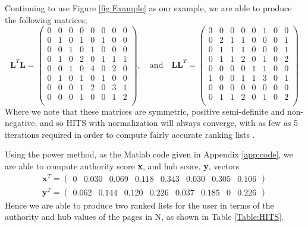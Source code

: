\documentclass[11pt]{report}
\begin{document}
Continuing to use Figure \ref{fig:Example} as our example, we are able to produce the following matrices;
\begin{equation*}
\textbf{L}^T\textbf{L}=\left(
\begin{array}{cccccccc}
0 & 0 & 0 & 0 & 0 & 0 & 0 & 0 \\
0 & 1 & 0 & 1 & 0 & 1 & 0 & 0 \\
0 & 0 & 1 & 0 & 1 & 0 & 0 & 0 \\
0 & 1 & 0 & 2 & 0 & 1 & 1 & 1 \\
0 & 0 & 1 & 0 & 4 & 0 & 2 & 0 \\
0 & 1 & 0 & 1 & 0 & 1 & 0 & 0 \\
0 & 0 & 0 & 1 & 2 & 0 & 3 & 1 \\
0 & 0 & 0 & 1 & 0 & 0 & 1 & 2 \\
\end{array}
\right)
\mathrm{,}\quad\mathrm{and}\quad
\textbf{LL}^T=\left(
\begin{array}{cccccccc}
3 & 0 & 0 & 0 & 0 & 1 & 0 & 0 \\
0 & 2 & 1 & 1 & 0 & 0 & 0 & 1 \\
0 & 1 & 1 & 1 & 0 & 0 & 0 & 1 \\
0 & 1 & 1 & 2 & 0 & 1 & 0 & 2 \\
0 & 0 & 0 & 0 & 1 & 1 & 0 & 0 \\
1 & 0 & 0 & 1 & 1 & 3 & 0 & 1 \\
0 & 0 & 0 & 0 & 0 & 0 & 0 & 0 \\
0 & 1 & 1 & 2 & 0 & 1 & 0 & 2 \\
\end{array}
\right)
\end{equation*} Where we note that these matrices are symmetric, positive semi-definite and non-negative, and so HITS with normalization will always converge, with as few as 5 iterations required in order to compute fairly accurate ranking lists \cite{manning}. 

Using the power method, as the Matlab code given in Appendix \ref{app:code}, we are able to compute authority score \textbf{x}, and hub score, \textbf{y}, vectors
\begin{eqnarray}
\textbf{x}^T = \left( \begin{array} {cccccccc}
0 & 0.030 & 0.069 & 0.118 & 0.343 &0.030 &0.305 &0.106
\end{array}\right) \\
\textbf{y}^T = \left( \begin{array} {cccccccc}
0.062 & 0.144 & 0.120 & 0.226 & 0.037 & 0.185 & 0 & 0.226
\end{array}\right)
\end{eqnarray} Hence we are able to produce two ranked lists for the user in terms of the authority and hub values of the pages in N, as shown in Table \ref{Table:HITS}.
\end{document}
